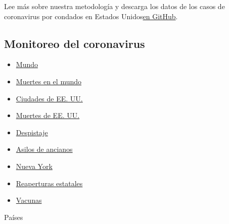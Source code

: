 Lee más sobre nuestra metodología y descarga los datos de los casos de
coronavirus por condados en Estados
Unidos\href{https://github.com/nytimes/covid-19-data}{en GitHub}.

\hypertarget{monitoreo-del-coronavirus}{%
\subsection{Monitoreo del coronavirus}\label{monitoreo-del-coronavirus}}

\begin{itemize}
\tightlist
\item
  \href{https://www.nytimes.com/interactive/2020/world/coronavirus-maps.html}{Mundo}
\item
  \href{https://www.nytimes.com/interactive/2020/04/21/world/coronavirus-missing-deaths.html}{Muertes
  en el mundo}
\item
  \href{https://www.nytimes.com/interactive/2020/04/23/upshot/five-ways-to-monitor-coronavirus-outbreak-us.html}{Ciudades
  de EE. UU.}
\item
  \href{https://www.nytimes.com/interactive/2020/05/05/us/coronavirus-death-toll-us.html}{Muertes
  de EE. UU.}
\item
  \href{https://www.nytimes.com/interactive/2020/us/coronavirus-testing.html}{Despistaje}
\item
  \href{https://www.nytimes.com/interactive/2020/us/coronavirus-nursing-homes.html}{Asilos
  de ancianos}
\item
  \href{https://www.nytimes.com/interactive/2020/nyregion/new-york-city-coronavirus-cases.html}{Nueva
  York}
\item
  \href{https://www.nytimes.com/interactive/2020/us/states-reopen-map-coronavirus.html}{Reaperturas
  estatales}
\item
  \href{https://www.nytimes.com/interactive/2020/science/coronavirus-vaccine-tracker.html}{Vacunas}
\end{itemize}

Países

